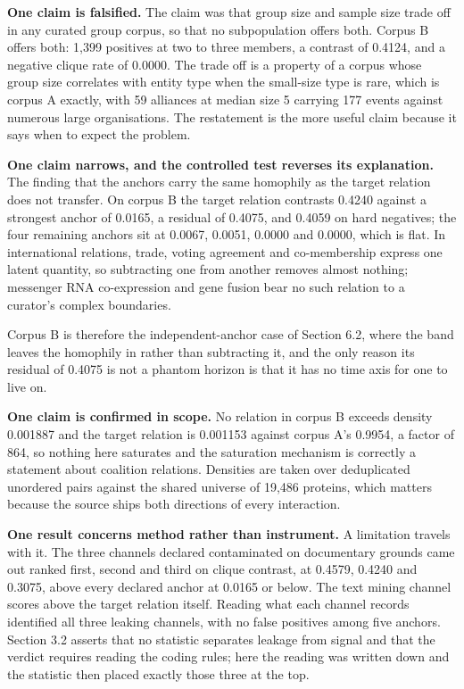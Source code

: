 \documentclass[twoside,11pt]{article}
\begin{document}
\textbf{One claim is falsified.} The claim was that group size and sample size trade off in any curated group corpus, so that no subpopulation offers both. Corpus B offers both: 1,399 positives at two to three members, a contrast of 0.4124, and a negative clique rate of 0.0000. The trade off is a property of a corpus whose group size correlates with entity type when the small-size type is rare, which is corpus A exactly, with 59 alliances at median size 5 carrying 177 events against numerous large organisations. The restatement is the more useful claim because it says when to expect the problem.

\textbf{One claim narrows, and the controlled test reverses its explanation.} The finding that the anchors carry the same homophily as the target relation does not transfer. On corpus B the target relation contrasts 0.4240 against a strongest anchor of 0.0165, a residual of 0.4075, and 0.4059 on hard negatives; the four remaining anchors sit at 0.0067, 0.0051, 0.0000 and 0.0000, which is flat. In international relations, trade, voting agreement and co-membership express one latent quantity, so subtracting one from another removes almost nothing; messenger RNA co-expression and gene fusion bear no such relation to a curator's complex boundaries.

Corpus B is therefore the independent-anchor case of Section 6.2, where the band leaves the homophily in rather than subtracting it, and the only reason its residual of 0.4075 is not a phantom horizon is that it has no time axis for one to live on.

\textbf{One claim is confirmed in scope.} No relation in corpus B exceeds density 0.001887 and the target relation is 0.001153 against corpus A's 0.9954, a factor of 864, so nothing here saturates and the saturation mechanism is correctly a statement about coalition relations. Densities are taken over deduplicated unordered pairs against the shared universe of 19,486 proteins, which matters because the source ships both directions of every interaction.

\textbf{One result concerns method rather than instrument.} A limitation travels with it. The three channels declared contaminated on documentary grounds came out ranked first, second and third on clique contrast, at 0.4579, 0.4240 and 0.3075, above every declared anchor at 0.0165 or below. The text mining channel scores above the target relation itself. Reading what each channel records identified all three leaking channels, with no false positives among five anchors. Section 3.2 asserts that no statistic separates leakage from signal and that the verdict requires reading the coding rules; here the reading was written down and the statistic then placed exactly those three at the top.
\end{document}

